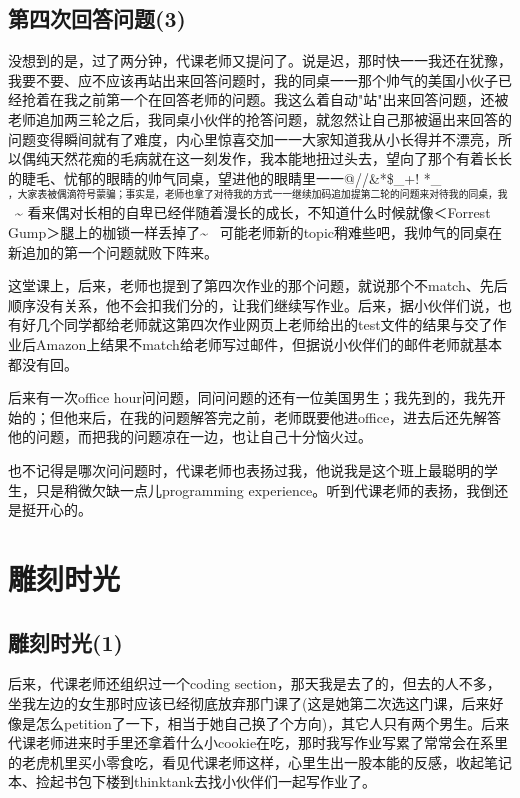 \documentclass[12pt]{book}
\begin{document}
\section{第四次回答问题(3)}
\label{sec-5-3}

没想到的是，过了两分钟，代课老师又提问了。说是迟，那时快一一我还在犹豫，我要不要、应不应该再站出来回答问题时，我的同桌一一那个帅气的美国小伙子已经抢着在我之前第一个在回答老师的问题。我这么着自动"站"出来回答问题，还被老师追加两三轮之后，我同桌小伙伴的抢答问题，就忽然让自己那被逼出来回答的问题变得瞬间就有了难度，内心里惊喜交加一一大家知道我从小长得并不漂亮，所以偶纯天然花痴的毛病就在这一刻发作，我本能地扭过头去，望向了那个有着长长的睫毛、忧郁的眼睛的帅气同桌，望进他的眼睛里一一@//\&*\$\_+! *\_$^{\text{，大家表被偶滴符号蒙骗；事实是，老师也拿了对待我的方式一一继续加码追加提第二轮的问题来对待我的同桌，我眼睁睁、眼巴巴地望着同桌白皙的脸庞、大大的眼睛，但他却是望着老师在谨慎地回答着问题的}}$~\textasciitilde{} 看来偶对长相的自卑已经伴随着漫长的成长，不知道什么时候就像＜Forrest Gump＞腿上的枷锁一样丢掉了\textasciitilde{}~ 可能老师新的topic稍难些吧，我帅气的同桌在新追加的第一个问题就败下阵来。

这堂课上，后来，老师也提到了第四次作业的那个问题，就说那个不match、先后顺序没有关系，他不会扣我们分的，让我们继续写作业。后来，据小伙伴们说，也有好几个同学都给老师就这第四次作业网页上老师给出的test文件的结果与交了作业后Amazon上结果不match给老师写过邮件，但据说小伙伴们的邮件老师就基本都没有回。

后来有一次office hour问问题，同问问题的还有一位美国男生；我先到的，我先开始的；但他来后，在我的问题解答完之前，老师既要他进office，进去后还先解答他的问题，而把我的问题凉在一边，也让自己十分恼火过。

也不记得是哪次问问题时，代课老师也表扬过我，他说我是这个班上最聪明的学生，只是稍微欠缺一点儿programming experience。听到代课老师的表扬，我倒还是挺开心的。

\chapter{雕刻时光}
\label{sec-6}
\section{雕刻时光(1)}
\label{sec-6-1}

后来，代课老师还组织过一个coding section，那天我是去了的，但去的人不多，坐我左边的女生那时应该已经彻底放弃那门课了(这是她第二次选这门课，后来好像是怎么petition了一下，相当于她自己换了个方向)，其它人只有两个男生。后来代课老师进来时手里还拿着什么小cookie在吃，那时我写作业写累了常常会在系里的老虎机里买小零食吃，看见代课老师这样，心里生出一股本能的反感，收起笔记本、捡起书包下楼到thinktank去找小伙伴们一起写作业了。
\end{document}
